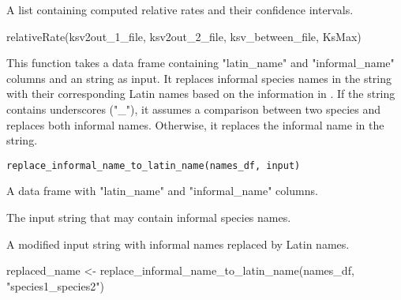 \documentclass[a4paper]{book}
\begin{document}
%
\begin{Value}
A list containing computed relative rates and their confidence intervals.
\end{Value}
%
\begin{Examples}
\begin{ExampleCode}
relativeRate(ksv2out_1_file, ksv2out_2_file, ksv_between_file, KsMax)
\end{ExampleCode}
\end{Examples}
%
\begin{Description}\relax
This function takes a data frame  containing "latin\_name" and "informal\_name" columns and an  string as input. It replaces informal species names in the  string with their corresponding Latin names based on the information in . If the  string contains underscores ("\_"), it assumes a comparison between two species and replaces both informal names. Otherwise, it replaces the informal name in the  string.
\end{Description}
%
\begin{Usage}
\begin{verbatim}
replace_informal_name_to_latin_name(names_df, input)
\end{verbatim}
\end{Usage}
%
\begin{Arguments}
\begin{ldescription}
\item[\code{names\_df}] A data frame with "latin\_name" and "informal\_name" columns.

\item[\code{input}] The input string that may contain informal species names.
\end{ldescription}
\end{Arguments}
%
\begin{Value}
A modified input string with informal names replaced by Latin names.
\end{Value}
%
\begin{Examples}
\begin{ExampleCode}
replaced_name <- replace_informal_name_to_latin_name(names_df, "species1_species2")
\end{ExampleCode}
\end{Examples}
\end{document}
